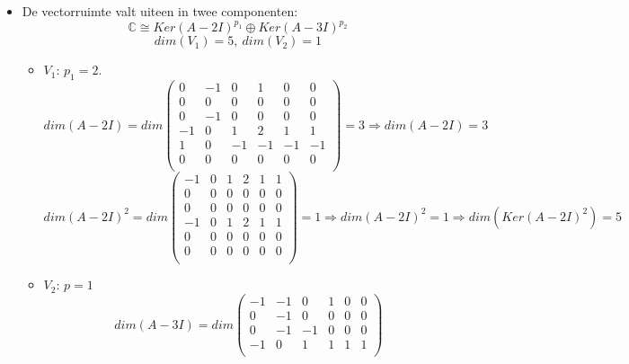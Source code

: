 \documentclass[main.tex]{subfiles}
\begin{document}
\begin{itemize}
\begin{itemize}
\[\begin{array}{l}
         (X-2)\left((X-4)(X-1) +1\right)
         + ((X-1)-1)
       \right)\\
       =
       (X-2)^{3}
       \left(
         (X-2)\left(X^{2}-5X+5\right)
         + ((X-2)
       \right)\\
       =
       (X-2)^{4}
       \left(X^{2}-5X+6\right)\\
       =
       (X-2)^{5}(X-3)\\
     \end{array}
     \]
   \item De vectorruimte valt uiteen in twee componenten:
     \[ \mathbb{C} \cong Ker(A-2I)^{p_{1}} \oplus Ker(A-3I)^{p_{2}} \]
     \[ dim(V_{1}) = 5,\ dim(V_{2})=1 \]
     \begin{itemize}
     \item $V_{1}$: $p_{1}=2$.
       \[
       dim(A-2I) = dim 
       \begin{pmatrix}
         0 & -1 & 0 & 1 & 0 & 0\\
         0 & 0 & 0 & 0 & 0 & 0\\
         0 & -1 & 0 & 0 & 0 & 0\\
         -1 & 0 & 1 & 2 & 1 & 1\\
         1 & 0 & -1 & -1 & -1 & -1\\
         0 & 0 & 0 & 0 & 0 & 0\\
       \end{pmatrix}
       =3 \Rightarrow dim(A-2I) = 3
       \]
       \[ dim(A-2I)^{2} = dim
       \begin{pmatrix}
         -1 & 0 & 1 & 2 & 1 & 1\\
         0 & 0 & 0 & 0 & 0 & 0\\
         0 & 0 & 0 & 0 & 0 & 0\\
         -1 & 0 & 1 & 2 & 1 & 1\\
         0 & 0 & 0 & 0 & 0 & 0\\
         0 & 0 & 0 & 0 & 0 & 0\\
       \end{pmatrix}
       =1 \Rightarrow dim(A-2I)^{2} = 1 \Rightarrow dim(Ker(A-2I)^{2}) = 5
       \]
     \item $V_{2}$: $p=1$
       \[
       dim(A-3I) = dim
       \begin{pmatrix}
         -1 & -1 & 0 & 1 & 0 & 0\\
         0 & -1 & 0 & 0 & 0 & 0\\
         0 & -1 & -1 & 0 & 0 & 0\\
         -1 & 0 & 1 & 1 & 1 & 1\\

\end{pmatrix}\]
\end{itemize}
\end{itemize}
\end{itemize}
\end{document}

